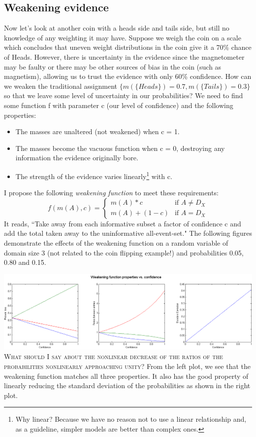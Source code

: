 \documentclass[letterpaper]{article}
\begin{document}
\subsection{Weakening evidence}
Now let's look at another coin with a heads side and tails side, but still no knowledge of any weighting it may have.  Suppose we weigh the coin on a scale which concludes that uneven weight distributions in the coin give it a 70\% chance of Heads.  However, there is uncertainty in the evidence since the magnetometer may be faulty or there may be other sources of bias in the coin (such as magnetism), allowing us to trust the evidence with only 60\% confidence.  How can we weaken the traditional assignment $\{ m(\{Heads\})=0.7, m(\{Tails\})=0.3 \}$ so that we leave some level of uncertainty in our probabilities?  We need to find some function f with parameter c (our level of confidence) and the following properties:
\begin{itemize}
\item The masses are unaltered (not weakened) when c = 1.
\item The masses become the vacuous function when c = 0, destroying any information the evidence originally bore.
\item The strength of the evidence varies linearly\footnote{Why linear? Because we have no reason not to use a linear relationship and, as a guideline, simpler models are better than complex ones.} with c. %
\end{itemize}
I propose the following \textit{weakening function} to meet these requirements:
\[ f(m(A),c) = \begin{cases}
	m(A)*c &\mbox{if } A \neq D_X\\
	m(A)+(1-c) &\mbox{if } A = D_X \end{cases}
\]
It reads, ``Take away from each informative subset a factor of confidence c and add the total taken away to the uninformative all-event-set." The following figures demonstrate the effects of the weakening function on a random variable of domain size 3 (not related to the coin flipping example!) and probabilities 0.05, 0.80 and 0.15.

\includegraphics[width=\linewidth]{WeakeningFunctionExamplePlots.png}
\textsc{What should I say about the nonlinear decrease of the ratios of the probabilities nonlinearly approaching unity?}
From the left plot, we see that the weakening function matches all three properties.  It also has the good property of linearly reducing the standard deviation of the probabilities as shown in the right plot.
\end{document}
